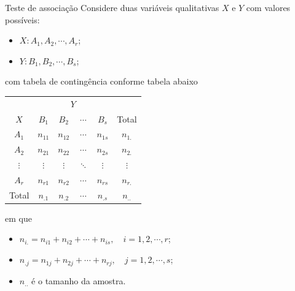 \documentclass[9pt]{beamer}
\begin{document}
\begin{frame}{Teste de associação}
Considere duas variáveis qualitativas $X$ e $Y$ com valores possíveis:
\begin{itemize}
	\item $X: A_1, A_2, \cdots, A_r$;
	\item $Y: B_1, B_2, \cdots, B_s$;
\end{itemize}
com tabela de contingência conforme tabela abaixo
\begin{table}[htbp]
	\centering
	\begin{tabular}{c|cccc|c}
		\toprule[0.05cm]
		& \multicolumn{4}{|c|}{$Y$} & \\ \cmidrule[0.05cm]{2-5}
		$X$ & $B_1$ & $B_2$ & $\cdots$ & $B_s$ & Total\\ \midrule[0.05cm]
		$A_1$ & $n_{11}$ & $n_{12}$ & $\cdots$ & $n_{1s}$ & $n_{1.}$\\
		$A_2$ & $n_{21}$ & $n_{22}$ & $\cdots$ & $n_{2s}$ & $n_{2.}$\\
		$\vdots$ & $\vdots$ & $\vdots$ & $\ddots$ & $\vdots$ & $\vdots$\\
		$A_r$ & $n_{r1}$ & $n_{r2}$ & $\cdots$ & $n_{rs}$ & $n_{r.} $\\ \midrule[0.05cm]
		Total & $n_{.1}$ & $n_{.2}$ & $\cdots$ & $n_{.s}$ & $n_{..}$\\
		\bottomrule[0.05cm]
	\end{tabular}
\end{table}
em que 
\begin{itemize}
	\item $n_{i.} = n_{i1}+n_{i2}+\cdots+n_{is}, \quad i =1,2, \cdots, r$;
	\item $n_{.j} = n_{1j}+n_{2j}+\cdots+n_{rj}, \quad j =1,2, \cdots, s$;
	\item $n_{..}$ é o tamanho da amostra.
\end{itemize}

\end{frame}
\end{document}
